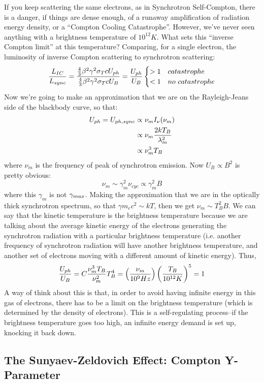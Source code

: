 \documentclass[11pt]{article}
\begin{document}
If you keep scattering the same electrons, as in Synchrotron Self-Compton,
there is a danger, if things are dense enough, of a runaway amplification
of radiation energy density, or a ``Compton Cooling Catastrophe''.  However,
we've never seen anything with a brightness temperature of $10^{12}K$.  
What sets this ``inverse Compton limit'' at this temperature?  Comparing,
for a single electron,
the luminosity of inverse Compton scattering to synchrotron scattering:
$${L_{IC}\over L_{sync}}={{4\over3}\beta^2\gamma^2\sigma_TcU_{ph}\over
{4\over3}\beta^2\gamma^2\sigma_TcU_B}={U_{ph}\over U_B}
\begin{cases} >1&catastrophe\\ <1 &no\ catastrophe\end{cases}$$
Now we're going to make an approximation that we are on the Rayleigh-Jeans
side of the blackbody curve, so that:
$$\begin{aligned}U_{ph}=U_{ph,sync}&\propto\nu_mI_\nu(\nu_m)\\ 
&\propto\nu_m{2kT_B\over\lambda_m^2}\\ 
&\propto\nu_m^3T_B\\ \end{aligned}$$
where $\nu_m$ is the frequency of peak of synchrotron emission. 
Now $U_B\propto B^2$ is pretty obvious:  
$$\nu_m\sim\gamma_m^2\nu_{cyc}\propto\gamma_m^2B$$
where this $\gamma_m$ is not $\gamma_{max}$.  Making the approximation that we
are in the optically thick synchrotron spectrum, so that $\gamma m_ec^2\sim
kT$, then we get $\nu_m\sim T_B^2B$.  We can say that the kinetic temperature
is the brightness temperature because we are talking about the average kinetic
energy of the electrons generating the synchrotron radiation with a particular
brightness temperature (i.e. another frequency of synchrotron radiation will
have another brightness temperature, and another set of electrons moving
with a different amount of kinetic energy). Thus,
$${U_{ph}\over U_B}=C{\nu_m^3T_B\over\nu_m^2}T_B^4
=\left({\nu_m\over10^9Hz}\right)\left({T_B\over10^{12}K}\right)^5=1$$
A way of think about this is that, in order to avoid having infinite energy
in this gas of electrons, there has to be a limit on the brightness 
temperature (which is determined by the density of electrons).  This is a
self-regulating process--if the brightness temperature goes too high, an
infinite energy demand is set up, knocking it back down.

\subsection*{ The Sunyaev-Zeldovich Effect: Compton Y-Parameter}
\end{document}
